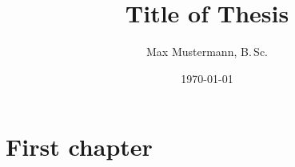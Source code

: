 \documentclass[type=master,twoside,BCOR=1cm]{rwuthesis}
\title{Title of Thesis}
\author{Max Mustermann, B.\,Sc.}
\date{\today}
\begin{document}
\maketitle
\tableofcontents

\chapter{First chapter}

\lipsum
\end{document}
